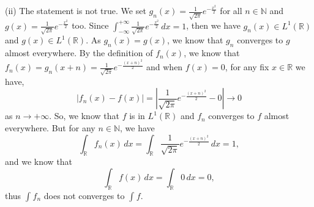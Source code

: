 \documentclass[12pt,a4paper]{ctexart}
\begin{document}
(ii) The statement is not true. We set $g_{n} (x) = \frac{1}{\sqrt{2 \pi}} e^{- \frac{x^{2}}{2}}$ for all $n \in \mathbb{N}$ and $g (x) = \frac{1}{\sqrt{2 \pi}} e^{- \frac{x^{2}}{2}}$ too. Since $\int_{- \infty}^{+ \infty} \frac{1}{\sqrt{2 \pi}} e^{- \frac{x^{2}}{2}} \, d x = 1$, then we have $g_{n} (x) \in L^{1}(\mathbb{R})$ and $g(x) \in L^{1}(\mathbb{R})$. As $g_{n} (x) = g(x)$, we know that $g_{n}$ converges to $g$ almost everywhere. By the definition of $f_{n}(x)$, we know that $f_{n}(x) = g_{n} (x + n) = \frac{1}{\sqrt{2 \pi}} e^{- \frac{(x+n)^{2}}{2}}$ and when $f(x) = 0$, for any fix $x \in \mathbb{R}$ we have,
\begin{equation*}
   |f_{n}(x) - f(x)| = |\frac{1}{\sqrt{2 \pi}} e^{- \frac{(x+n)^{2}}{2}} - 0| \to 0 
\end{equation*}
as $n \to + \infty$. So, we know that $f$ is in $L^{1}(\mathbb{R})$ and $f_{n}$ converges to $f$ almost everywhere. But for any $n \in \mathbb{N}$, we have
\begin{equation*}
   \int_{\mathbb{R}}^{} f_{n} (x) \, d x = \int_{\mathbb{R}}^{} \frac{1}{\sqrt{2 \pi}} e^{- \frac{(x+n)^{2}}{2}} \, d x = 1,
\end{equation*}
and we know that
\begin{equation*}
   \int_{\mathbb{R}}^{} f (x) \, d x = \int_{\mathbb{R}}^{} 0 \, d x = 0,
\end{equation*}
thus $\int_{}^{} f_{n}$ does not converges to $\int_{}^{} f$. 
\end{document}
